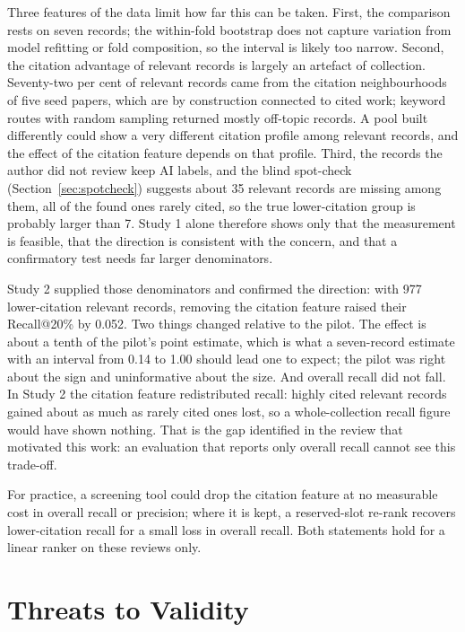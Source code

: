\documentclass[acmsmall,screen,nonacm]{acmart}
\begin{document}
Three features of the data limit how far this can be taken. First, the comparison rests on seven records;
the within-fold bootstrap does not capture variation from model refitting or fold composition, so the
interval is likely too narrow. Second, the citation advantage of relevant records is largely an
artefact of collection. Seventy-two per cent of relevant records came from the citation neighbourhoods of
five seed papers, which are by construction connected to cited work; keyword routes with random sampling
returned mostly off-topic records. A pool built differently could show a very different citation profile
among relevant records, and the effect of the citation feature depends on that profile. Third, the records the author did not review keep AI labels, and the blind spot-check
(Section~\ref{sec:spotcheck}) suggests about 35 relevant records are missing among them, all of the found
ones rarely cited, so the true lower-citation group is probably larger than 7. Study 1 alone therefore
shows only that the measurement is feasible, that the direction is consistent with the concern, and that
a confirmatory test needs far larger denominators.

Study 2 supplied those denominators and confirmed the direction: with 977 lower-citation relevant
records, removing the citation feature raised their Recall@20\% by 0.052. Two things changed relative to
the pilot. The effect is about a tenth of the pilot's point estimate, which is what a seven-record
estimate with an interval from 0.14 to 1.00 should lead one to expect; the pilot was right about the sign
and uninformative about the size. And overall recall did not fall. In Study 2 the citation feature
redistributed recall: highly cited relevant records gained about as much as rarely cited ones lost, so a
whole-collection recall figure would have shown nothing. That is the gap identified in the review that
motivated this work: an evaluation that reports only overall recall cannot see this trade-off.

For practice, a screening tool could drop the citation feature at no measurable cost in overall recall
or precision; where it is kept, a reserved-slot re-rank recovers lower-citation recall for a small loss in
overall recall. Both statements hold for a linear ranker on these reviews only.

\section{Threats to Validity}
\label{sec:threats}
\end{document}
